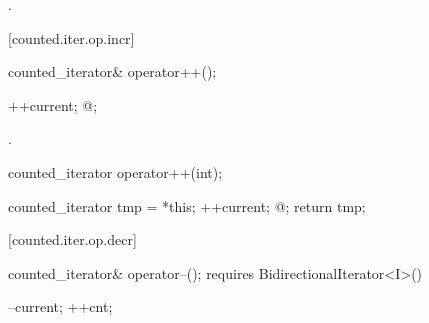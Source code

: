 \begin{addedblock}
\begin{itemdescr}
\pnum
\oldtxt{\returns}
.
\end{itemdescr}

[counted.iter.op.incr]{}

%
%
\begin{itemdecl}
counted_iterator& operator++();
\end{itemdecl}

\begin{itemdescr}
\pnum
\requires {}

\pnum
\effects {}
\begin{codeblock}
++current;
@\dcr@cnt;
\end{codeblock}

\pnum
\returns {}.
\end{itemdescr}

%
%
\begin{itemdecl}
counted_iterator operator++(int);
\end{itemdecl}

\begin{itemdescr}
\pnum
\requires {}

\pnum
\effects {}
\begin{codeblock}
counted_iterator tmp = *this;
++current;
@\dcr@cnt;
return tmp;
\end{codeblock}
\end{itemdescr}

[counted.iter.op.decr]{}

%
%
\begin{itemdecl}
  counted_iterator& operator--();
    requires BidirectionalIterator<I>()
\end{itemdecl}

\begin{itemdescr}
\pnum
\effects {}
\begin{codeblock}
--current;
++cnt;
\end{codeblock}


\end{itemdescr}
\end{addedblock}
